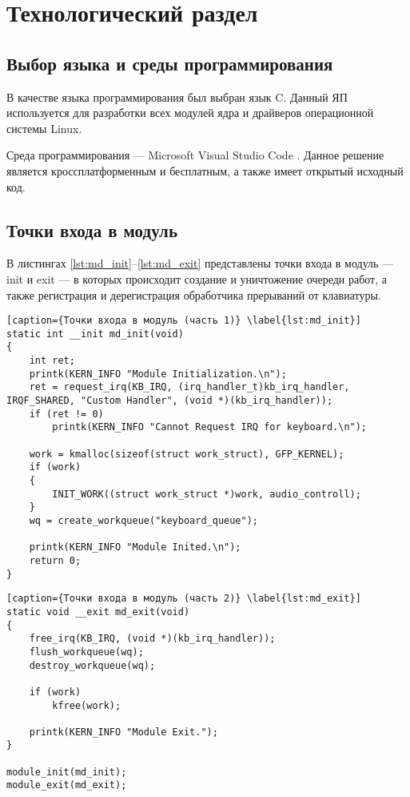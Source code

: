 \chapter{Технологический раздел}

\section{Выбор языка и среды программирования}

В качестве языка программирования был выбран язык C. Данный ЯП используется для разработки всех модулей ядра и драйверов операционной системы Linux.

Среда программирования --- Microsoft Visual Studio Code \cite{vscode}. Данное решение является кроссплатформенным и бесплатным, а также имеет открытый исходный код.

\section{Точки входа в модуль}
В листингах \ref{lst:md_init}--\ref{lst:md_exit} представлены точки входа в модуль --- init и exit --- в которых происходит создание и уничтожение очереди работ, а также регистрация и дерегистрация обработчика прерываний от клавиатуры. 

\begin{lstlisting}[caption={Точки входа в модуль (часть 1)} \label{lst:md_init}]
static int __init md_init(void)
{
    int ret;
    printk(KERN_INFO "Module Initialization.\n");
    ret = request_irq(KB_IRQ, (irq_handler_t)kb_irq_handler, IRQF_SHARED, "Custom Handler", (void *)(kb_irq_handler));
    if (ret != 0)
        printk(KERN_INFO "Cannot Request IRQ for keyboard.\n");

    work = kmalloc(sizeof(struct work_struct), GFP_KERNEL);
    if (work)
    {
        INIT_WORK((struct work_struct *)work, audio_controll);
    }
    wq = create_workqueue("keyboard_queue");

    printk(KERN_INFO "Module Inited.\n");
    return 0;
}
\end{lstlisting}

\clearpage

\begin{lstlisting}[caption={Точки входа в модуль (часть 2)} \label{lst:md_exit}]
static void __exit md_exit(void)
{
    free_irq(KB_IRQ, (void *)(kb_irq_handler));
    flush_workqueue(wq);
    destroy_workqueue(wq);

    if (work)
        kfree(work);

    printk(KERN_INFO "Module Exit.");
}

module_init(md_init);
module_exit(md_exit);
\end{lstlisting}

